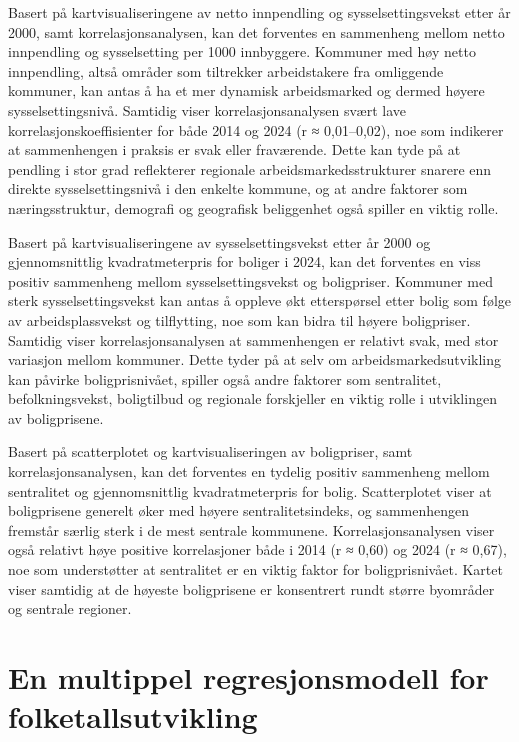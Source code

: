 \documentclass[
  norsk,
  letterpaper,
  DIV=11,
  numbers=noendperiod]{scrartcl}
\begin{document}
Basert på kartvisualiseringene av netto innpendling og
sysselsettingsvekst etter år 2000, samt korrelasjonsanalysen, kan det
forventes en sammenheng mellom netto innpendling og sysselsetting per
1000 innbyggere. Kommuner med høy netto innpendling, altså områder som
tiltrekker arbeidstakere fra omliggende kommuner, kan antas å ha et mer
dynamisk arbeidsmarked og dermed høyere sysselsettingsnivå. Samtidig
viser korrelasjonsanalysen svært lave korrelasjonskoeffisienter for både
2014 og 2024 (r ≈ 0,01--0,02), noe som indikerer at sammenhengen i
praksis er svak eller fraværende. Dette kan tyde på at pendling i stor
grad reflekterer regionale arbeidsmarkedsstrukturer snarere enn direkte
sysselsettingsnivå i den enkelte kommune, og at andre faktorer som
næringsstruktur, demografi og geografisk beliggenhet også spiller en
viktig rolle.

Basert på kartvisualiseringene av sysselsettingsvekst etter år 2000 og
gjennomsnittlig kvadratmeterpris for boliger i 2024, kan det forventes
en viss positiv sammenheng mellom sysselsettingsvekst og boligpriser.
Kommuner med sterk sysselsettingsvekst kan antas å oppleve økt
etterspørsel etter bolig som følge av arbeidsplassvekst og tilflytting,
noe som kan bidra til høyere boligpriser. Samtidig viser
korrelasjonsanalysen at sammenhengen er relativt svak, med stor
variasjon mellom kommuner. Dette tyder på at selv om
arbeidsmarkedsutvikling kan påvirke boligprisnivået, spiller også andre
faktorer som sentralitet, befolkningsvekst, boligtilbud og regionale
forskjeller en viktig rolle i utviklingen av boligprisene.

Basert på scatterplotet og kartvisualiseringen av boligpriser, samt
korrelasjonsanalysen, kan det forventes en tydelig positiv sammenheng
mellom sentralitet og gjennomsnittlig kvadratmeterpris for bolig.
Scatterplotet viser at boligprisene generelt øker med høyere
sentralitetsindeks, og sammenhengen fremstår særlig sterk i de mest
sentrale kommunene. Korrelasjonsanalysen viser også relativt høye
positive korrelasjoner både i 2014 (r ≈ 0,60) og 2024 (r ≈ 0,67), noe
som understøtter at sentralitet er en viktig faktor for boligprisnivået.
Kartet viser samtidig at de høyeste boligprisene er konsentrert rundt
større byområder og sentrale regioner.

\section{En multippel regresjonsmodell for
folketallsutvikling}\label{en-multippel-regresjonsmodell-for-folketallsutvikling}
\end{document}
